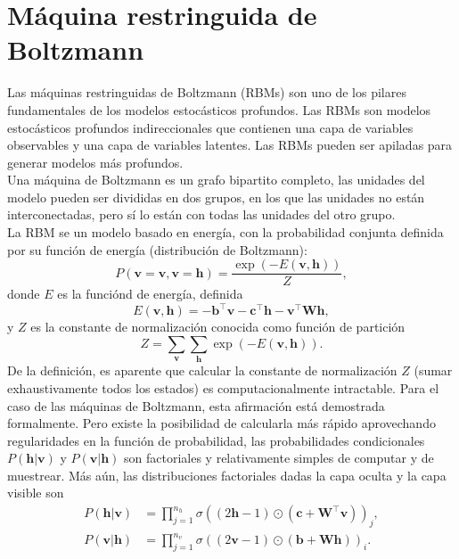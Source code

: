 \documentclass[12pt,a4paper]{article}
\begin{document}
\section{Máquina restringuida de Boltzmann}
Las máquinas restringuidas de Boltzmann (RBMs) son uno de los pilares fundamentales de los modelos estocásticos profundos. Las RBMs son modelos estocásticos profundos indireccionales que contienen una capa de variables observables y una capa de variables latentes. Las RBMs pueden ser apiladas para generar modelos más profundos.\\
Una máquina de Boltzmann es un grafo bipartito completo, las unidades del modelo pueden ser divididas en dos grupos, en los que las unidades no están interconectadas, pero sí lo están con todas las unidades del otro grupo.\\
La RBM se un modelo basado en energía, con la probabilidad conjunta definida por su función de energía (distribución de Boltzmann):
$$
P(\mathbf{v} = \boldsymbol{v}, \mathbf{v} = \boldsymbol{h}) = \frac{\exp(-E(\boldsymbol{v}, \boldsymbol{h}))}{Z},
$$
donde $E$ es la funciónd de energía, definida
$$
E(\boldsymbol{v}, \boldsymbol{h}) = -\boldsymbol{b}^\top \boldsymbol{v} - \boldsymbol{c}^\top \boldsymbol{h} - \boldsymbol{v}^\top \boldsymbol{W} \boldsymbol{h},
$$
y $Z$ es la constante de normalización conocida como función de partición
$$
Z = \sum_{\boldsymbol{v}} \sum_{\boldsymbol{h}} \exp(-E(\boldsymbol{v}, \boldsymbol{h})).
$$
De la definición, es aparente que calcular la constante de normalización $Z$ (sumar exhaustivamente todos los estados) es computacionalmente intractable. Para el caso de las máquinas de Boltzmann, esta afirmación está demostrada formalmente. Pero existe la posibilidad de calcularla más rápido aprovechando regularidades en la función de probabilidad, las probabilidades condicionales $P(\mathbf{h}|\mathbf{v})$ y $P(\mathbf{v}|\mathbf{h})$ son factoriales y relativamente simples de computar y de muestrear. Más aún, las distribuciones factoriales dadas la capa oculta y la capa visible son
$$
\begin{aligned}
P(\boldsymbol{h}|\boldsymbol{v}) &= \prod_{j=1}^{n_h} \sigma\left((2\boldsymbol{h} - 1) \odot (\boldsymbol{c} + \boldsymbol{W}^\top \boldsymbol{v})\right)_j,\\
P(\boldsymbol{v}|\boldsymbol{h}) &= \prod_{j=1}^{n_v} \sigma\left((2\boldsymbol{v} - 1) \odot (\boldsymbol{b} + \boldsymbol{W} \boldsymbol{h})\right)_i.
\end{aligned}
$$
\end{document}
